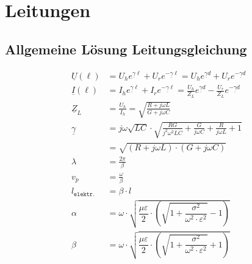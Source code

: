 \section{Leitungen}
\subsection{Allgemeine Lösung Leitungsgleichung}
\begin{align*}
    \underline{U}(\ell)   & = U_h e^{\underline{\gamma} \ell} + U_r e^{-\underline{\gamma} \ell} = U_h e^{\underline{\gamma} d} + U_r e^{-\underline{\gamma} d}                       \\
    \underline{I}(\ell)   & = I_h e^{\underline{\gamma} \ell} + I_r e^{-\underline{\gamma} \ell} = \frac{U_h}{Z_L}e^{\underline{\gamma} d} - \frac{U_r}{Z_L}e^{-\underline{\gamma} d} \\
    \underline{Z}_L    & = \frac{U_h}{I_h} = \sqrt{ \frac{R + j \omega L}{G + j \omega C}}                                                                                   \\
    \underline{\gamma} & = j \omega \sqrt{LC} \cdot \sqrt{ \frac{RG}{j^2 \omega^2 LC} + \frac{G}{j \omega C} + \frac{R}{j \omega L} + 1}                                     \\
                       & = \sqrt{(R+j\omega L)\cdot(G+j\omega C)}                                                                                                            \\
    \lambda            & = \frac{2 \pi}{\beta}                                                                                                                               \\
    v_p                & = \frac{\omega}{\beta}                                                                                                                              \\
    l_\texttt{elektr.} & = \beta \cdot l                                                                                                                                     \\
    \alpha             & = \omega \cdot \sqrt{\dfrac{\mu \varepsilon}{2}\cdot \left(\sqrt{1+\dfrac{\sigma^2}{\omega^2\cdot\varepsilon^2}}- 1\right)}           \\
    \beta              & = \omega \cdot \sqrt{\dfrac{\mu \varepsilon}{2}\cdot \left(\sqrt{1+\dfrac{\sigma^2}{\omega^2\cdot\varepsilon^2}}+ 1\right)}
\end{align*}
